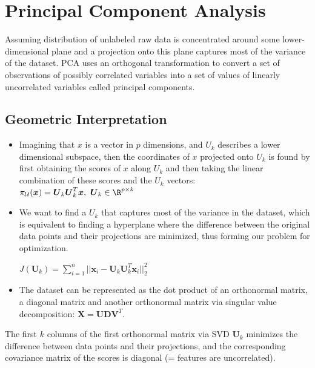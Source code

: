 \documentclass[english]{latex4ei/latex4ei_sheet}
\begin{document}
\newpage
\section{Principal Component Analysis}
\begin{sectionbox}
Assuming distribution of unlabeled raw data is concentrated around some lower-dimensional plane and a projection onto this plane captures most of the variance of the dataset. PCA uses an orthogonal transformation to convert a set of observations of possibly correlated variables into a set of values of linearly uncorrelated variables called principal components.\\
\subsection{Geometric Interpretation}
\begin{itemize}
\item Imagining that $x$ is a vector in $p$ dimensions, and $U_k$ describes a lower dimensional subspace, then the coordinates of $x$ projected onto $U_k$ is found by first obtaining the scores of $x$ along $U_k$ and then taking the linear combination of these scores and the $U_k$ vectors: $\pi_\mathcal{U}(\boldsymbol{x})=\boldsymbol{U}_k\boldsymbol{U}_k^T\boldsymbol{x}, \ \boldsymbol{U}_k\in\R^{p\times k}$
\item We want to find a $U_k$ that captures most of the variance in the dataset, which is equivalent to finding a hyperplane where the difference between the original data points and their projections are minimized, thus forming our problem for optimization.\\
\begin{center}
    $J(\boldsymbol{U}_k)=\sum\limits_{i=1}^n||\boldsymbol{x}_i-\boldsymbol{U}_k\boldsymbol{U}_k^T\boldsymbol{x}_i||^2_2$
\end{center}
\item The dataset can be represented as the dot product of an orthonormal matrix, a diagonal matrix and another orthonormal matrix via singular value decomposition: $\boldsymbol{X}=\boldsymbol{UDV}^T$.
\end{itemize}
\begin{emphbox}
    The first $k$ columns of the first orthonormal matrix via SVD $\boldsymbol{U}_k$ minimizes the difference between data points and their projections, and the corresponding covariance matrix of the scores is diagonal (= features are uncorrelated).
\end{emphbox}

\end{sectionbox}
\end{document}

